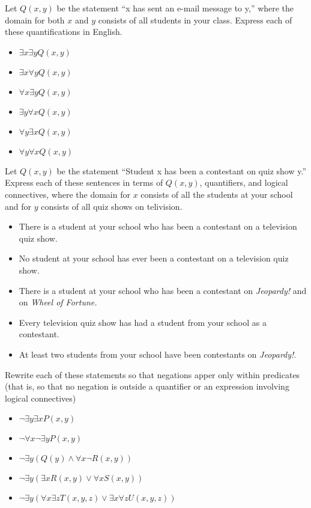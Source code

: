\documentclass{article}
\newenvironment{problem}[2][Problem]{\begin{trivlist}
\item[\hskip \labelsep {\bfseries #1}\hskip \labelsep {\bfseries #2.}]}{\end{trivlist}}
\begin{document}
\begin{problem}{15}
Let $Q(x,y)$ be the statement ``x has sent an e-mail message to y,'' where the domain for both $x$ and $y$ consists of all students in your class. Express each of these quantifications in English.
\begin{itemize}
    \item[(a)] $\exists x \exists y Q(x,y)$
    \item[(b)] $\exists x \forall y Q(x,y)$
    \item[(c)] $\forall x \exists y Q(x,y)$
    \item[(d)] $\exists y \forall x Q(x,y)$
    \item[(e)] $\forall y \exists x Q(x,y)$
    \item[(f)] $\forall y \forall x Q(x,y)$
\end{itemize}
\end{problem}

\begin{problem}{16}
Let $Q(x,y)$ be the statement ``Student x has been a contestant on quiz show y.'' Express each of these sentences in terms of $Q(x,y)$, quantifiers, and logical connectives, where the domain for $x$ consists of all
the students at your school and for $y$ consists of all quiz shows on telivision.
\begin{itemize}
    \item[(a)] There is a student at your school who has been a contestant on a television quiz show.
    \item[(b)] No student at your school has ever been a contestant on a television quiz show.
    \item[(c)] There is a student at your school who has been a contestant on \textit{Jeopardy!} and on \textit{Wheel of Fortune.}
    \item[(d)] Every television quiz show has had a student from your school as a contestant.
    \item[(e)] At least two students from your school have been contestants on \textit{Jeopardy!}.
\end{itemize}

\end{problem}

\begin{problem}{17}
Rewrite each of these statements so that negations apper only within predicates (that is, so that no negation is outside a quantifier or an expression involving logical connectives)
\begin{itemize}
    \item[(a)] $\neg \exists y \exists x P(x,y)$
    \item[(b)] $\neg \forall x \neg \exists y P(x,y)$
    \item[(c)] $\neg \exists y(Q(y) \land \forall x \neg R(x, y))$
    \item[(d)] $\neg \exists y(\exists x R(x, y) \lor \forall x S(x, y))$
    \item[(e)] $\neg \exists y(\forall x \exists z T(x, y, z) \lor \exists x \forall z U(x, y, z))$
\end{itemize}

\end{problem}
\end{document}
